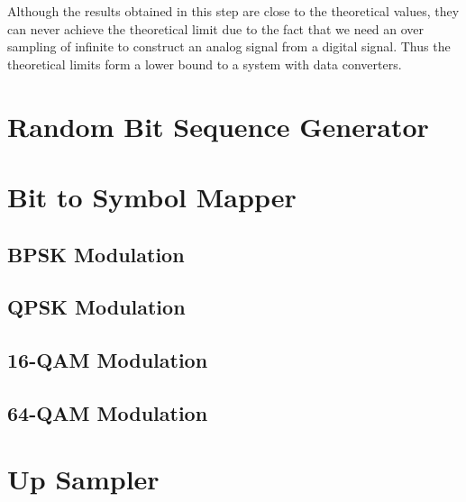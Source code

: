 \documentclass[]{article}
\begin{document}
Although the results obtained in this step are close to the theoretical values, they can never achieve the theoretical limit due to the fact that we need an over sampling of infinite to construct an analog signal from a digital signal. Thus the theoretical limits form a lower bound to a system with data converters.  

\appendix
\newpage


\newpage
%

\section{Random Bit Sequence Generator}
\label{app:random_bit_generator}


\section{Bit to Symbol Mapper}
\label{app:bittosym}
\subsection{BPSK Modulation}
\label{app:bpsk_mod}


\subsection{QPSK Modulation}
\label{app:qpsk_mod}


\subsection{16-QAM Modulation}
\label{app:qam16_mod}


\subsection{64-QAM Modulation}
\label{app:qam64_mod}


\section{Up Sampler}
\label{app:impulse_train}

\end{document}
